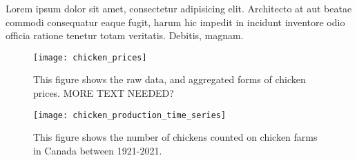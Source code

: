 Lorem ipsum dolor sit amet, consectetur adipisicing elit. Architecto at aut beatae commodi consequatur eaque fugit, harum hic impedit in incidunt inventore odio officia ratione tenetur totam veritatis. Debitis, magnam.



\begin{figure}
    \texttt{[image: chicken\_prices]}
    \caption{This figure shows the raw data, and aggregated forms of chicken prices. MORE TEXT NEEDED?}
    \label{fig:chicken_prices}
\end{figure}


\begin{figure}
    \texttt{[image: chicken\_production\_time\_series]}
    \caption{This figure shows the number of chickens counted on chicken farms in Canada between 1921-2021.}
    \label{fig:chicken_production}
\end{figure}